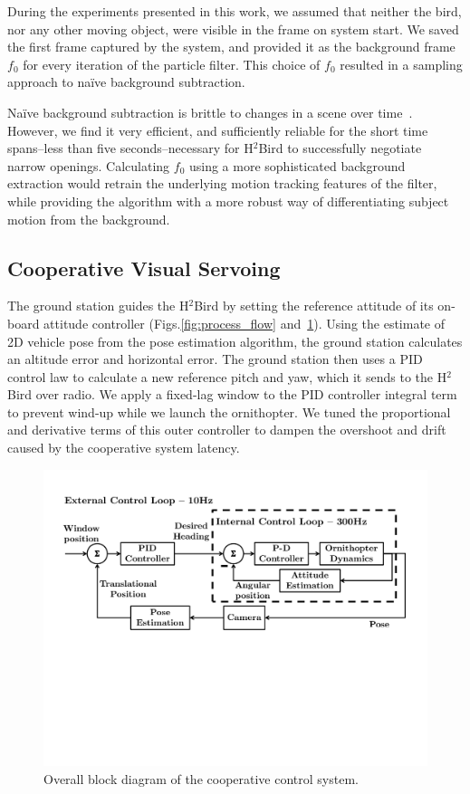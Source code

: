 \documentclass{aamas2013}
\begin{document}
During the experiments presented in this work, we assumed that neither the 
bird, nor any other moving object, were visible in the frame on system 
start. We saved the first frame captured by the system, and provided it as 
the background frame $f_0$ for every iteration of the particle filter. This 
choice of $f_0$ resulted in a sampling approach to na\"{i}ve background 
subtraction. 

Na\"{i}ve background subtraction is brittle to changes in a scene over 
time~\cite{Ahad2011Computer}. However, we find it very efficient, and sufficiently 
reliable for the short time spans--less than five seconds--necessary for 
H$^2$Bird to successfully negotiate narrow openings. Calculating $f_0$ 
using a more sophisticated background extraction would retrain the 
underlying motion tracking features of the filter, while providing the 
algorithm with a more robust way of differentiating subject motion from the 
background.

\subsection{Cooperative Visual Servoing}
\label{sec:visual_servoing_concept}
The ground station guides the H$^2$Bird by setting the
reference attitude of its on-board attitude 
controller (Figs.\ref{fig:process_flow} and~\ref{fig:block_diagram}). Using 
the estimate of 2D vehicle pose from the pose estimation algorithm, the 
ground station calculates an altitude error and horizontal error. The ground 
station then uses a PID control law to calculate a new reference pitch and yaw, 
which it sends to the H$^2$Bird over radio. 
We apply a fixed-lag window to the PID 
controller integral term to prevent wind-up while we launch the ornithopter. 
We tuned the proportional and derivative terms of this outer controller to 
dampen the overshoot and drift caused by the cooperative system latency.
\begin{figure}[tb]
\centering
\includegraphics[width=\linewidth]{figures/block_diagrams.pdf}
\caption{Overall block diagram of the cooperative control system.}
\label{fig:block_diagram}
\end{figure}
\end{document}
